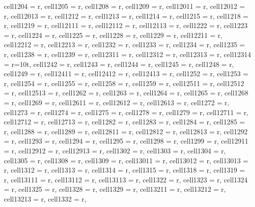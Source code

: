 \begin{landscape}
\begin{longtblr}[
  caption = {Changes in average values and effects differences significance from post hoc analysis.},
  label = {tab:appendix_LCBM_all_results_post_hocs}
]
{  cell{120}{4} = {r},
  cell{120}{5} = {r},
  cell{120}{8} = {r},
  cell{120}{9} = {r},
  cell{120}{11} = {r},
  cell{120}{12} = {r},
  cell{120}{13} = {r},
  cell{121}{2} = {r},
  cell{121}{3} = {r},
  cell{121}{4} = {r},
  cell{121}{5} = {r},
  cell{121}{8} = {r},
  cell{121}{9} = {r},
  cell{121}{11} = {r},
  cell{121}{12} = {r},
  cell{121}{13} = {r},
  cell{122}{2} = {r},
  cell{122}{3} = {r},
  cell{122}{4} = {r},
  cell{122}{5} = {r},
  cell{122}{8} = {r},
  cell{122}{9} = {r},
  cell{122}{11} = {r},
  cell{122}{12} = {r},
  cell{122}{13} = {r},
  cell{123}{2} = {r},
  cell{123}{3} = {r},
  cell{123}{4} = {r},
  cell{123}{5} = {r},
  cell{123}{8} = {r},
  cell{123}{9} = {r},
  cell{123}{11} = {r},
  cell{123}{12} = {r},
  cell{123}{13} = {r},
  cell{123}{14} = {r=10}{t},
  cell{124}{2} = {r},
  cell{124}{3} = {r},
  cell{124}{4} = {r},
  cell{124}{5} = {r},
  cell{124}{8} = {r},
  cell{124}{9} = {r},
  cell{124}{11} = {r},
  cell{124}{12} = {r},
  cell{124}{13} = {r},
  cell{125}{2} = {r},
  cell{125}{3} = {r},
  cell{125}{4} = {r},
  cell{125}{5} = {r},
  cell{125}{8} = {r},
  cell{125}{9} = {r},
  cell{125}{11} = {r},
  cell{125}{12} = {r},
  cell{125}{13} = {r},
  cell{126}{2} = {r},
  cell{126}{3} = {r},
  cell{126}{4} = {r},
  cell{126}{5} = {r},
  cell{126}{8} = {r},
  cell{126}{9} = {r},
  cell{126}{11} = {r},
  cell{126}{12} = {r},
  cell{126}{13} = {r},
  cell{127}{2} = {r},
  cell{127}{3} = {r},
  cell{127}{4} = {r},
  cell{127}{5} = {r},
  cell{127}{8} = {r},
  cell{127}{9} = {r},
  cell{127}{11} = {r},
  cell{127}{12} = {r},
  cell{127}{13} = {r},
  cell{128}{2} = {r},
  cell{128}{3} = {r},
  cell{128}{4} = {r},
  cell{128}{5} = {r},
  cell{128}{8} = {r},
  cell{128}{9} = {r},
  cell{128}{11} = {r},
  cell{128}{12} = {r},
  cell{128}{13} = {r},
  cell{129}{2} = {r},
  cell{129}{3} = {r},
  cell{129}{4} = {r},
  cell{129}{5} = {r},
  cell{129}{8} = {r},
  cell{129}{9} = {r},
  cell{129}{11} = {r},
  cell{129}{12} = {r},
  cell{129}{13} = {r},
  cell{130}{2} = {r},
  cell{130}{3} = {r},
  cell{130}{4} = {r},
  cell{130}{5} = {r},
  cell{130}{8} = {r},
  cell{130}{9} = {r},
  cell{130}{11} = {r},
  cell{130}{12} = {r},
  cell{130}{13} = {r},
  cell{131}{2} = {r},
  cell{131}{3} = {r},
  cell{131}{4} = {r},
  cell{131}{5} = {r},
  cell{131}{8} = {r},
  cell{131}{9} = {r},
  cell{131}{11} = {r},
  cell{131}{12} = {r},
  cell{131}{13} = {r},
  cell{132}{2} = {r},
  cell{132}{3} = {r},
  cell{132}{4} = {r},
  cell{132}{5} = {r},
  cell{132}{8} = {r},
  cell{132}{9} = {r},
  cell{132}{11} = {r},
  cell{132}{12} = {r},
  cell{132}{13} = {r},
  cell{133}{2} = {r},
}
\end{longtblr}
\end{landscape}

